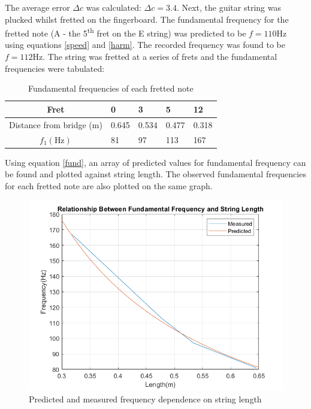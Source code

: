 \documentclass[11pt]{article}
\begin{document}
            The average error $\Delta c$ was calculated: $\Delta c = 3.4$.
            Next, the guitar string was plucked whilst fretted on the fingerboard.
            The fundamental frequency for the fretted note (A - the 5\textsuperscript{th} fret on the E string) was predicted to be $f=110\si{\hertz}$ using equations \ref{speed} and \ref{harm}.
            The recorded frequency was found to be $f=112\si{\hertz}$.
            The string was fretted at a series of frets and the fundamental frequencies were tabulated:
            \begin{table}[H]
                \centering
                \begin{tabular}{c | l l l l}
                    \hline
                    Fret & 0 & 3 & 5 & 12 \\
                    \hline
                    Distance from bridge (\si{\meter}) & 0.645 & 0.534 & 0.477 & 0.318 \\
                    \hline
                    $f_1(\si{\hertz})$ & 81 & 97 & 113 & 167 \\
                    \hline
                \end{tabular}
                \caption{Fundamental frequencies of each fretted note}
            \end{table}
            Using equation \ref{fund}, an array of predicted values for fundamental frequency can be found and plotted against string length.
            The observed fundamental frequencies for each fretted note are also plotted on the same graph.
            \begin{figure}[H]\label{f1vsl}
                \centering
                \includegraphics[scale=0.5]{resources/F1vsL.png}
                \caption{Predicted and measured frequency dependence on string length}
            \end{figure}
\end{document}
